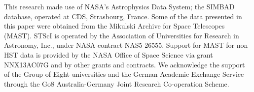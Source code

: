 \documentclass[modern]{aastex62}
\begin{document}
This research made use of NASA's Astrophysics Data System; the SIMBAD database, operated at CDS, Strasbourg, France. Some of the data presented in this paper were obtained from the Mikulski Archive for Space Telescopes (MAST). STScI is operated by the Association of Universities for Research in Astronomy, Inc., under NASA contract NAS5-26555. Support for MAST for non-HST data is provided by the NASA Office of Space Science via grant NNX13AC07G and by other grants and contracts. We acknowledge the support of the Group of Eight universities and the German Academic Exchange Service through the Go8 Australia-Germany Joint Research Co-operation Scheme. 







\appendix

% 
% 











\end{document}
